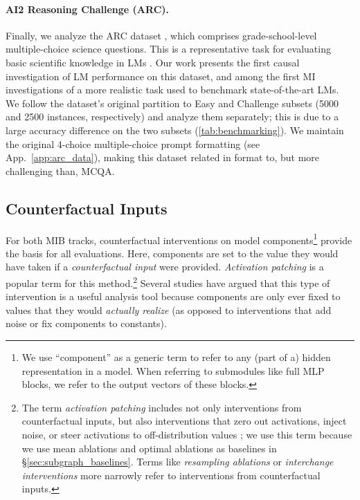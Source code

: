 \documentclass{article}
\theoremstyle{plain}
\theoremstyle{definition}
\theoremstyle{remark}
\newcommand{\mib}{\textsf{MIB}}
\newcommand{\arxiv}[1]{#1}
\begin{document}
\paragraph{AI2 Reasoning Challenge (ARC).}
Finally, we analyze the ARC dataset \citep{clark2018think}, which comprises grade-school-level multiple-choice science questions. This is a representative task for evaluating
basic scientific knowledge in LMs \citep{gpt3,jiang2023mistral7b,llama3}.
Our work presents the first causal investigation of LM performance on this dataset\arxiv{, and among the first MI investigations of a more realistic task used to benchmark state-of-the-art LMs}.
We follow the dataset's original partition to Easy and Challenge subsets (5000 and 2500 instances, respectively) and analyze them separately; this is due to a large accuracy difference on the two subsets (\autoref{tab:benchmarking}).
We maintain the original 4-choice multiple-choice prompt formatting (see App.~\ref{app:arc_data}), making this dataset related in format to, but more challenging than, MCQA.


\subsection{Counterfactual Inputs} 
For both \mib{} tracks, counterfactual interventions on model components\footnote{We use ``component'' as a generic term to refer to any (part of a) hidden representation in a model. When referring to submodules like full MLP blocks, we refer to the output vectors of these blocks.} provide the basis for all evaluations. Here, components are set to the value they would have taken if a \textit{counterfactual input} were provided. \emph{Activation patching} is a popular term for this method.\footnote{The term \emph{activation patching} includes not only interventions from counterfactual inputs, but also interventions 
that zero out activations, inject noise, or steer activations to off-distribution values \cite{wang2022interpretability, zhang2024towards}; we use this term because we use mean ablations and optimal ablations as baselines in \S\ref{sec:subgraph_baselines}. Terms like \textit{resampling ablations} \cite{chan2022causal} or \textit{interchange interventions} \cite{geiger2021} more narrowly refer to interventions from counterfactual inputs.}
Several studies
\cite{vig2020, geiger2021, chan2022causal} have argued that this type of intervention is a useful analysis tool because components are only ever fixed to values that they would \textit{actually realize} (as opposed to interventions that add noise or fix components to constants).
\end{document}
